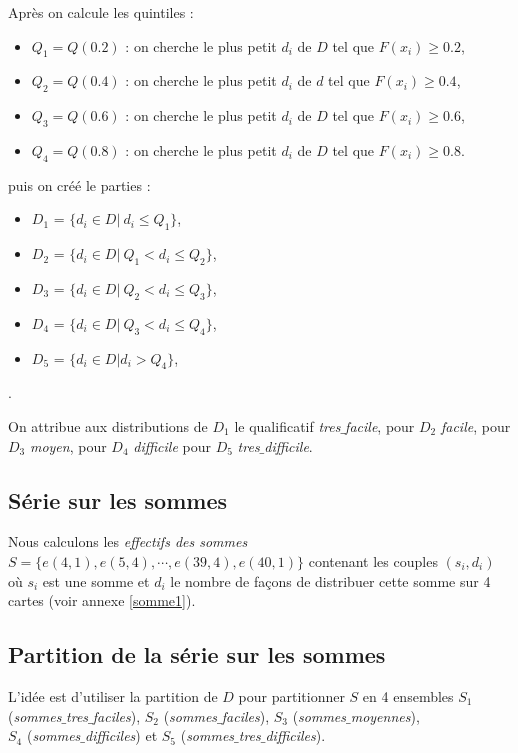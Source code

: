 \documentclass[a4paper, 12]{article}
\newcommand\set[1]{\ensuremath{\{#1\}}}
\begin{document}
Après on calcule les quintiles :
\begin{itemize}
\item $Q_1 = Q(0.2)$ : on cherche le plus petit $d_i$ de $D$ tel que $F(x_i) \ge 0.2$,
\item $Q_2 = Q(0.4)$ : on cherche le plus petit $d_i$ de $d$ tel que $F(x_i) \ge 0.4$,
\item $Q_3 = Q(0.6)$ : on cherche le plus petit $d_i$ de $D$ tel que $F(x_i) \ge 0.6$,
\item $Q_4 = Q(0.8)$ : on cherche le plus petit $d_i$ de $D$ tel que $F(x_i) \ge 0.8$.
\end{itemize}

puis on créé le parties :
\begin{itemize}
	\item $D_1$ = $\set{d_i \in D   | \ d_i \le Q_1}$,
	\item $D_2$ = $\set{d_i \in D   | \ Q_1 < d_i \le Q_2}$,
	\item $D_3$ = $\set{d_i \in D   | \ Q_2 < d_i \le Q_3}$,
	\item $D_4$ = $\set{d_i \in D   | \ Q_3 < d_i \le Q_4}$,
	\item $D_5$ = $\set{d_i \in D   |  d_i >  Q_4}$,
\end{itemize}.

On attribue aux distributions de $D_1$ le qualificatif \emph{tres$\_$facile}, pour $D_2$ \emph{facile}, pour $D_3$ \emph{moyen}, pour $D_4$ \emph{difficile} pour $D_5$ \emph{tres$\_$difficile}. 

\subsection{Série sur les sommes}
Nous calculons les \emph{effectifs des sommes} $ S = \set{e(4,1), e(5,4), \cdots, e(39,4), e(40,1)}$ contenant les couples $(s_i, d_i)$ où $s_i$ est une somme et $d_i$ le nombre de façons de distribuer cette somme sur 4 cartes (voir annexe \ref{somme1}). 

\subsection{Partition de la série sur les sommes}

L'idée est d'utiliser la partition de $D$ pour partitionner $S$ en 4 ensembles $S_1$ (\emph{sommes$\_$tres$\_$faciles}), $S_2$ (\emph{sommes$\_$faciles}), $S_3$ (\emph{sommes$\_$moyennes}),\\  $S_4$ (\emph{sommes$\_$difficiles}) et 
$S_5$ (\emph{sommes$\_$tres$\_$difficiles}).
\end{document}
